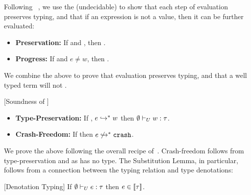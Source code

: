 Following \hlang~\cite{Knowles10}, we use the (undecidable) \rsubbase to show that each step 
of evaluation preserves typing, and that if an expression
is not a value, then it can be further evaluated:
%
\begin{itemize}
\item\textbf{Preservation:} 
	If  and , 
	then . 
\item\textbf{Progress:}
	If  and $e \not = w$,
	then . 
\end{itemize}
%
We combine the above to prove that evaluation preserves 
typing, and that a well typed term will not \ecrash.
%
\begin{theorem}{[Soundness of \undeclang]}\label{thm:safety}
\begin{itemize}
\item\textbf{Type-Preservation:} If , %
       $e \hookrightarrow_{}^{*} w$ then $\emptyset \vdash_U w:\mathit{\tau}$.
\item\textbf{Crash-Freedom:} If  
        then $e\not \hookrightarrow_{}^{*} \mathtt{crash}$.
\end{itemize}
\end{theorem}

We prove the above following the overall recipe of~\cite{Knowles10}. 
Crash-freedom follows from type-preservation and as \ecrash has no type.
%
The Substitution Lemma, in particular, follows from a connection between
the typing relation and type denotations:

\begin{lemma}{[Denotation Typing]}\label{lem:denotation}
If $\emptyset \vdash_U e:\mathit{\tau}$ then $e \in [\![\mathit{\tau}]\!]$.
\end{lemma} 

